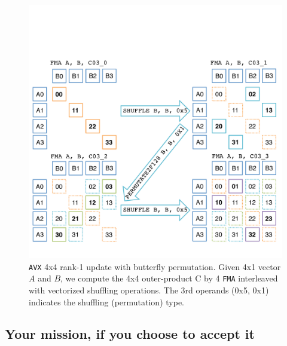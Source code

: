 \begin{figure}
\begin{center}
	\includegraphics[width=5in]{figures/avx_permute.pdf}
\end{center}
\caption{{\tt AVX} 4x4 rank-1 update with butterfly permutation. Given 4x1 vector $A$ and $B$, we compute the 4x4 outer-product C by 4 {\tt FMA} interleaved with vectorized shuffling operations. The 3rd operands (0x5, 0x1) indicates the shuffling (permutation) type.}
\label{fig:permutation}
\end{figure}

\subsection{Your mission, if you choose to accept it}


